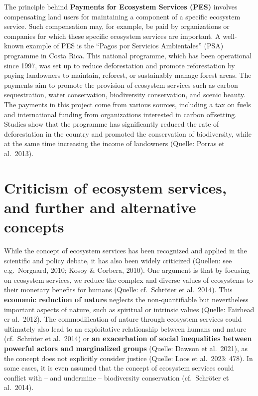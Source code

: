 \documentclass[
  a4paper,
  openany]{book}
\begin{document}
The principle behind \textbf{Payments for Ecosystem Services (PES)}
involves compensating land users for maintaining a component of a
specific ecosystem service. Such compensation may, for example, be paid
by organizations or companies for which these specific ecosystem
services are important. A well-known example of PES is the ``Pagos por
Servicios Ambientales'' (PSA) programme in Costa Rica. This national
programme, which has been operational since 1997, was set up to reduce
deforestation and promote reforestation by paying landowners to
maintain, reforest, or sustainably manage forest areas. The payments aim
to promote the provision of ecosystem services such as carbon
sequestration, water conservation, biodiversity conservation, and scenic
beauty. The payments in this project come from various sources,
including a tax on fuels and international funding from organizations
interested in carbon offsetting. Studies show that the programme has
significantly reduced the rate of deforestation in the country and
promoted the conservation of biodiversity, while at the same time
increasing the income of landowners (Quelle: Porras et al.~2013).

\section{Criticism of ecosystem services, and further and alternative
concepts}\label{criticism-of-ecosystem-services-and-further-and-alternative-concepts}

While the concept of ecosystem services has been recognized and applied
in the scientific and policy debate, it has also been widely criticized
(Quellen: see e.g.~Norgaard, 2010; Kosoy \& Corbera, 2010). One argument
is that by focusing on ecosystem services, we reduce the complex and
diverse values of ecosystems to their monetary benefits for humans
(Quelle: cf.~Schröter et al.~2014). This \textbf{economic reduction of
nature} neglects the non-quantifiable but nevertheless important aspects
of nature, such as spiritual or intrinsic values (Quelle: Fairhead er
al.~2012). The commodification of nature through ecosystem services
could ultimately also lead to an exploitative relationship between
humans and nature (cf.~Schröter et al.~2014) or \textbf{an exacerbation
of social inequalities between powerful actors and marginalized groups}
(Quelle: Dawson et al.~2021), as the concept does not explicitly
consider justice (Quelle: Loos et al.~2023: 478). In some cases, it is
even assumed that the concept of ecosystem services could conflict with
-- and undermine -- biodiversity conservation (cf.~Schröter et
al.~2014).
\end{document}
